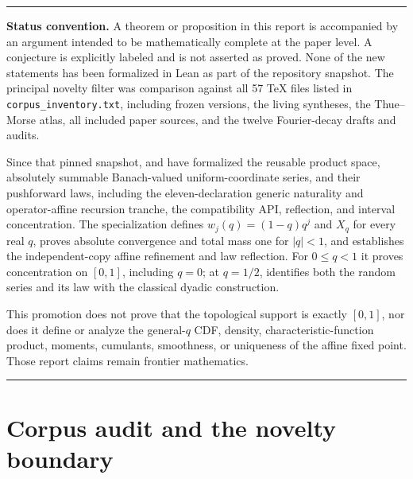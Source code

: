 \documentclass[11pt,oneside]{article}
\theoremstyle{definition}
\theoremstyle{remark}
\newenvironment{boxedremark}{%
  \par\smallskip\noindent\begin{center}\begin{minipage}{0.94\textwidth}%
  \color{black}\hrule\vspace{0.6em}\small
}{%
  \vspace{0.6em}\hrule\end{minipage}\end{center}\smallskip
}
\begin{document}
\begin{abstract}
The word \emph{new} is used only in a corpus-relative sense: these statements were not found
in the 57 TeX sources inspected in the specified repository snapshot.  No claim of global
priority is made.  Proven statements are separated sharply from conjectural transseries,
strict log-concavity, Edgeworth, inverse-phase, and arithmetic-collision problems.
Deterministic numerical experiments and all plotting code accompany the report.
\end{abstract}

\begin{boxedremark}
\textbf{Status convention.}
A theorem or proposition in this report is accompanied by an argument intended to be
mathematically complete at the paper level.  A conjecture is explicitly labeled and is not
asserted as proved.  None of the new statements has been formalized in Lean as part of the
repository snapshot.  The principal novelty filter was comparison against all 57 TeX files
listed in \texttt{corpus\_inventory.txt}, including frozen versions, the living syntheses,
the Thue--Morse atlas, all included paper sources, and the twelve Fourier-decay drafts and
audits.

Since that pinned snapshot,  and
 have formalized the reusable product space,
absolutely summable Banach-valued uniform-coordinate series, and their pushforward laws,
including the eleven-declaration generic naturality and operator-affine recursion tranche,
the compatibility API, reflection, and interval concentration.  The specialization
 defines
$w_j(q)=(1-q)q^j$ and $X_q$ for every real $q$, proves absolute convergence and total mass
one for $|q|<1$, and establishes the independent-copy affine refinement and law reflection.
For $0\le q<1$ it proves concentration on $[0,1]$, including $q=0$; at $q=1/2$,
 identifies both the random series and its law with
the classical dyadic construction.

This promotion does not prove that the topological support is exactly $[0,1]$, nor does it
define or analyze the general-$q$ CDF, density, characteristic-function product, moments,
cumulants, smoothness, or uniqueness of the affine fixed point.  Those report claims remain
frontier mathematics.
\end{boxedremark}

\tableofcontents
\newpage

\section{Corpus audit and the novelty boundary}
\label{sec:corpus}
\end{document}
